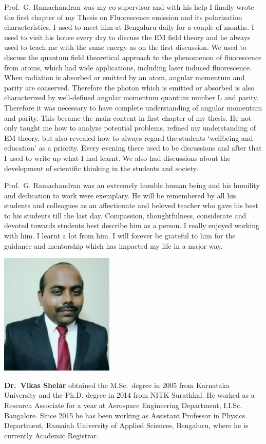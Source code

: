 Prof.\ G. Ramachandran was my co-supervisor and with his help I finally wrote the first chapter of my Thesis on Fluorescence emission and its polarization characteristics. I used to meet him at Bengaluru daily for a couple of months. I used to visit his house every day to discuss the EM field theory and he always used to teach me  with the same energy as on the first discussion. We used to discuss the quantum field theoretical approach to the phenomenon of fluorescence from atoms, which had wide applications, including laser induced fluorescence. When radiation is absorbed or emitted by an atom, angular momentum and parity are conserved. Therefore the photon which is emitted or absorbed is also characterized by well-defined angular momentum quantum number L and parity. Therefore it was necessary to have complete understanding of angular momentum and parity. This became the main content in first chapter of my thesis. He not only taught me how to analyze potential problems, refined my understanding of EM theory, but also revealed how to always regard the students `wellbeing and education' as a priority. Every evening there used to be discussions and after that I used to write up what I had learnt. We also had discussions about the development of scientific thinking in the students and society.

Prof.\ G. Ramachandran was an extremely humble human being and his humility and dedication to work were exemplary. He will be remembered by all his students and colleagues as an affectionate and beloved teacher who gave his best to his students till the last day. Compassion, thoughtfulness, considerate and devoted towards students best describe him as a person. I really enjoyed working with him. I learnt a lot from him. I will forever be grateful to him for the guidance and mentorship which has impacted my life in a major way.
\vskip 1cm

\centerline{\includegraphics[scale=2]{authorsphotos/Dr_Vikas_Shelar.eps}}
\smallskip

\bigskip

\noindent
\textbf{Dr.\ Vikas Shelar} obtained the M.Sc.\ degree in 2005 from Karnataka University and the Ph.D. degree in 2014 from NITK Surathkal.  He worked as a Research Associate for a year at Aerospace Engineering Department, I.I.Sc. Bangalore. Since 2015 he has been working as Assistant Professor in Physics Department, Ramaiah University of Applied Sciences, Bengaluru, where he is currently Academic Registrar.

